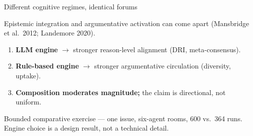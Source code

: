 \documentclass[aspectratio=169,11pt]{beamer}
\begin{document}
\begin{frame}{Different cognitive regimes, identical forums}

{\small Epistemic integration and argumentative activation can come apart (Mansbridge et al.\ 2012; Landemore 2020).}

\vspace{0.3cm}
\begin{enumerate}
    \item \textbf{LLM engine} $\to$ stronger reason-level alignment (DRI, meta-consensus).
    \item \textbf{Rule-based engine} $\to$ stronger argumentative circulation (diversity, uptake).
    \item \textbf{Composition moderates magnitude;} the claim is directional, not uniform.
\end{enumerate}

\vspace{0.4cm}
{\small Bounded comparative exercise --- one issue, six-agent rooms, 600 vs.\ 364 runs. Engine choice is a design result, not a technical detail.}

\end{frame}
\end{document}
